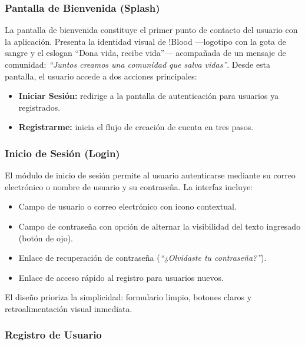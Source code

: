 \documentclass[12pt, a4paper]{article}
\begin{document}
\subsubsection{Pantalla de Bienvenida (Splash)}

La pantalla de bienvenida constituye el primer punto de contacto del usuario con la aplicación. Presenta la identidad visual de !Blood ---logotipo con la gota de sangre y el eslogan ``Dona vida, recibe vida''--- acompañada de un mensaje de comunidad: \textit{``Juntos creamos una comunidad que salva vidas''}. Desde esta pantalla, el usuario accede a dos acciones principales:

\begin{itemize}
    \item \textbf{Iniciar Sesión:} redirige a la pantalla de autenticación para usuarios ya registrados.
    \item \textbf{Registrarme:} inicia el flujo de creación de cuenta en tres pasos.
\end{itemize}

\subsubsection{Inicio de Sesión (Login)}

El módulo de inicio de sesión permite al usuario autenticarse mediante su correo electrónico o nombre de usuario y su contraseña. La interfaz incluye:

\begin{itemize}
    \item Campo de usuario o correo electrónico con icono contextual.
    \item Campo de contraseña con opción de alternar la visibilidad del texto ingresado (botón de ojo).
    \item Enlace de recuperación de contraseña (\textit{``¿Olvidaste tu contraseña?''}).
    \item Enlace de acceso rápido al registro para usuarios nuevos.
\end{itemize}

El diseño prioriza la simplicidad: formulario limpio, botones claros y retroalimentación visual inmediata.

\subsubsection{Registro de Usuario}
\end{document}
